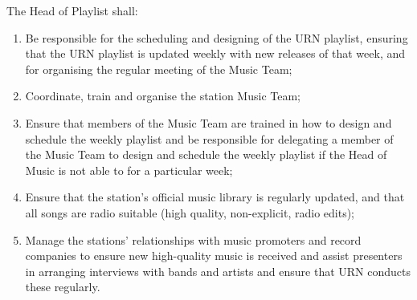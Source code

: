 \item The Head of Playlist shall:
\begin{enumerate}[label*=\arabic*.]
    \item Be responsible for the scheduling and designing of the URN playlist, ensuring that the URN playlist is updated weekly with new releases of that week, and for organising the regular meeting of the Music Team;
    \item Coordinate, train and organise the station Music Team;
    \item Ensure that members of the Music Team are trained in how to design and schedule the weekly playlist and be responsible for delegating a member of the Music Team to design and schedule the weekly playlist if the Head of Music is not able to for a particular week;
    \item Ensure that the station's official music library is regularly updated, and that all songs are radio suitable (high quality, non-explicit, radio edits);
    \item Manage the stations' relationships with music promoters and record companies to ensure new high-quality music is received and assist presenters in arranging interviews with bands and artists and ensure that URN conducts these regularly.
\end{enumerate}
